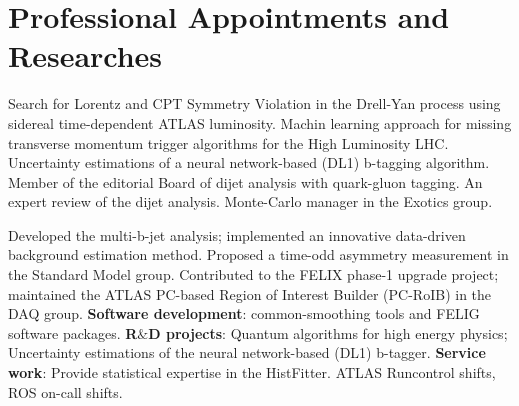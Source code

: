 \section{Professional Appointments and Researches}

\begin{cventries}
\end{cventries}
      \vspace{-1cm}
      \parbox{0.9\linewidth}{
      \leftskip=0.5in
       Search for Lorentz and  CPT Symmetry Violation in the Drell-Yan process using 
       sidereal time-dependent ATLAS luminosity. Machin learning approach for missing 
       transverse momentum trigger algorithms for the High Luminosity LHC. 
        Uncertainty estimations of a neural network-based (DL1) b-tagging algorithm.\newline
        Member of the editorial Board of dijet analysis with quark-gluon tagging. 
        An expert review of the dijet analysis. \newline
        Monte-Carlo manager in the Exotics group.
        }
 
 \begin{cventries}   
  \end{cventries}
  \vspace{-1cm}
   \parbox{0.9\linewidth}{
      \leftskip=0.5in
       Developed the multi-b-jet analysis; implemented an innovative data-driven background
       estimation method. Proposed a time-odd asymmetry measurement in the Standard Model group. \newline
        Contributed to the FELIX phase-1 upgrade project; maintained the ATLAS PC-based Region of 
        Interest Builder (PC-RoIB) in the DAQ group. \newline
        \textbf{Software development}: common-smoothing tools and FELIG software packages. \newline
        \textbf{R$\&$D projects}: Quantum algorithms for high energy physics; Uncertainty estimations 
        of the neural network-based (DL1) b-tagger. \newline
        \textbf{Service work}: Provide statistical expertise in the HistFitter. ATLAS Runcontrol shifts,
        ROS on-call shifts.
    }
    

